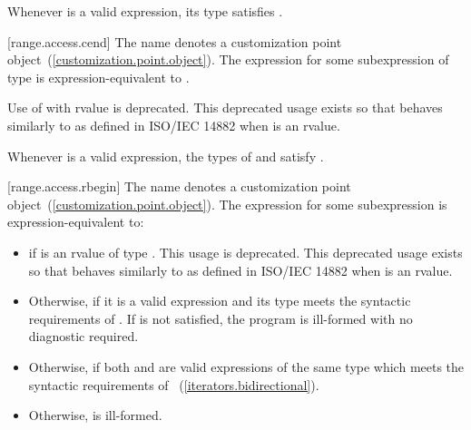 \pnum
\enternote Whenever  is a valid expression, its
type satisfies . \exitnote

[range.access.cend]{}
\pnum
The name  denotes a customization point
object~(\ref{customization.point.object}). The expression
 for some subexpression  of type 
is expression-equivalent to .

\pnum
Use of  with rvalue  is deprecated.
\enternote This deprecated usage exists so that 
behaves similarly to  as defined in ISO/IEC 14882 when
 is an rvalue. \exitnote

\pnum
\enternote Whenever  is a valid expression, the
types of  and  satisfy
. \exitnote

[range.access.rbegin]{}
\pnum
The name  denotes a customization point
object~(\ref{customization.point.object}). The expression
 for some subexpression  is expression-equivalent
to:

\begin{itemize}
\item
   if  is an rvalue of
  type . This usage is deprecated.
  \enternote This deprecated usage exists so that
   behaves similarly to 
  as defined in ISO/IEC 14882 when  is an rvalue. \exitnote

\item
  Otherwise,  if it is a valid expression and its type  meets the
  syntactic requirements of . If 
  is not satisfied, the program is ill-formed with no diagnostic
  required.

\item
  Otherwise,  if both
   and  are valid expressions of the same
  type  which meets the syntactic requirements of
  ~(\ref{iterators.bidirectional}).

\item
  Otherwise,  is ill-formed.
\end{itemize}

